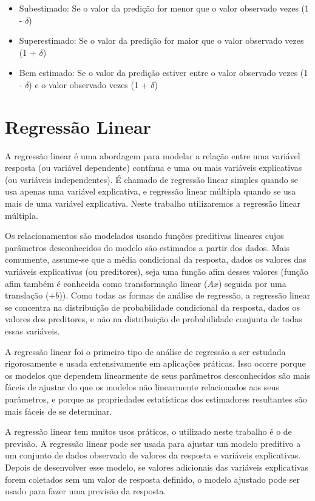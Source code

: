 \begin{itemize}
	\item Subestimado: Se o valor da predição for menor que o valor observado vezes (1 - $ \delta $)
	\item Superestimado: Se o valor da predição for maior que o valor observado vezes (1 + $ \delta $)
	\item Bem estimado: Se o valor da predição estiver entre o valor observado vezes (1 - $ \delta $) e o valor observado vezes (1 + $ \delta $)
\end{itemize}

\section{Regressão Linear}
\label{sec:regressao_linear}

A regressão linear é uma abordagem para modelar a relação entre uma variável resposta (ou variável dependente) contínua e uma ou mais variáveis ​​explicativas (ou variáveis ​​independentes). É chamado de regressão linear simples quando se usa apenas uma variável explicativa, e regressão linear múltipla quando se usa mais de uma variável explicativa. Neste trabalho utilizaremos a regressão linear múltipla.

Os relacionamentos são modelados usando funções preditivas lineares cujos parâmetros desconhecidos do modelo são estimados a partir dos dados. Mais comumente, assume-se que a média condicional da resposta, dados os valores das variáveis ​​explicativas (ou preditores), seja uma função afim desses valores (função afim também é conhecida como transformação linear ($ Ax $) seguida por uma translação ($ +b $)). Como todas as formas de análise de regressão, a regressão linear se concentra na distribuição de probabilidade condicional da resposta, dados os valores dos preditores, e não na distribuição de probabilidade conjunta de todas essas variáveis.

A regressão linear foi o primeiro tipo de análise de regressão a ser estudada rigorosamente e usada extensivamente em aplicações práticas. Isso ocorre porque os modelos que dependem linearmente de seus parâmetros desconhecidos são mais fáceis de ajustar do que os modelos não linearmente relacionados aos seus parâmetros, e porque as propriedades estatísticas dos estimadores resultantes são mais fáceis de se determinar.

A regressão linear tem muitos usos práticos, o utilizado neste trabalho é o de previsão. A regressão linear pode ser usada para ajustar um modelo preditivo a um conjunto de dados observado de valores da resposta e variáveis ​​explicativas. Depois de desenvolver esse modelo, se valores adicionais das variáveis ​​explicativas forem coletados sem um valor de resposta definido, o modelo ajustado pode ser usado para fazer uma previsão da resposta.

